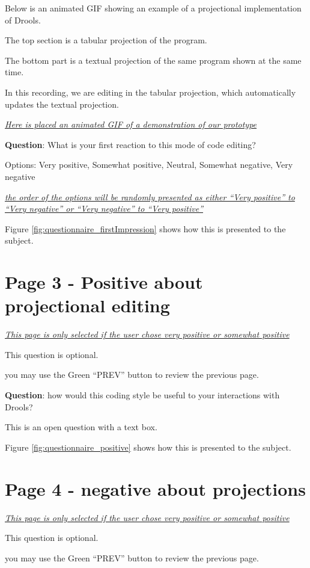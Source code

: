 Below is an animated GIF showing an example of a projectional implementation of Drools.

The top section is a tabular projection of the program.

The bottom part is a textual projection of the same program shown at the same time.

In this recording, we are editing in the tabular projection, which automatically updates the textual projection.

\emph{\underline{Here is placed an animated GIF of a demonstration of our prototype}}

\textbf{Question}: What is your first reaction to this mode of code editing?

Options: Very positive, Somewhat positive, Neutral, Somewhat negative, Very negative 

\emph{\underline{the order of the options will be randomly presented as either ``Very positive'' to ``Very negative'' or ``Very negative'' to ``Very positive''}}

Figure \ref{fig:questionnaire_firstImpression} shows how this is presented to the subject.

\section{Page 3 - Positive about projectional editing}

\emph{\underline{This page is only selected if the user chose very positive or somewhat positive}}

This question is optional.

you may use the Green ``PREV'' button to review the previous page.

\textbf{Question}: how would this coding style be useful to your interactions with Drools?

This is an open question with a text box.

Figure \ref{fig:questionnaire_positive} shows how this is presented to the subject.

\section{Page 4 - negative about projections}

\emph{\underline{This page is only selected if the user chose very positive or somewhat positive}}

This question is optional.

you may use the Green ``PREV'' button to review the previous page.

